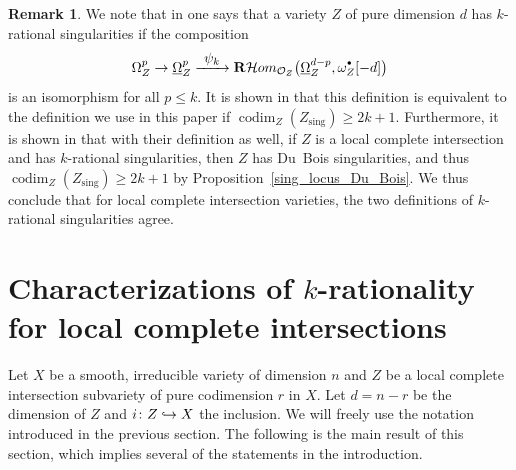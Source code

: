 \documentclass[11pt]{article}
\numberwithin{equation}{section}
\newcommand{\To}[1]{\mathchoice{\xrightarrow{\textstyle\kern4pt#1\kern3pt}}{\stackrel{#1}{\longrightarrow}}{}{}}
\newcommand\hto{\mathrel{\lhook\joinrel\to}}
\newcommand{\sbullet}{{\scriptscriptstyle\bullet}}
\newcommand{\csbullet}{{\raisebox{1pt}{$\sbullet$}}}
\theoremstyle{plain}
\theoremstyle{definition}
\newtheorem{rmk}[thm]{Remark}
\newcommand\R{{\mathbf R}}
\newcommand\cH{\mathcal{H}}
\newcommand\cO{\mathcal{O}}
\newcommand\cH{\mathcal{H}}
\newcommand\cO{\mathcal{O}}
\newcommand\sing{\mathrm{sing}}
\DeclareMathOperator{\codim}{codim}
\begin{document}
\begin{rmk}\label{rmk_equiv_two_defi}
We note that in \cite{FL2} one says that a variety $Z$ of pure dimension $d$ has $k$-rational singularities if the composition
\[\Omega_Z^p\to \underline{\Omega}_Z^p\To{\psi_k}\R\cH om_{\cO_Z}\big(\underline{\Omega}_Z^{d-p},\omega_Z^{\csbullet}[-d]\big)\]
is an isomorphism for all $p\leq k$. It is shown in \cite[Cor.\,3.17]{FL2} that this definition is equivalent to the definition we use in this paper if $\codim_Z(Z_\sing)\geq 2k+1$.
Furthermore, it is shown in \cite[Th.\,3.20]{FL2} that with their definition as well, if $Z$ is a local complete intersection and has $k$-rational singularities,
then $Z$ has Du~Bois singularities, and thus $\codim_Z(Z_\sing)\geq 2k+1$ by Proposition~\ref{sing_locus_Du_Bois}. We thus conclude
that for local complete intersection varieties, the two definitions of $k$-rational singularities agree.
\end{rmk}

\section{Characterizations of \texorpdfstring{$k$}{k}-rationality for local complete intersections}\label{section3}

Let $X$ be a smooth, irreducible variety of dimension $n$ and $Z$ be a local complete intersection subvariety of pure codimension $r$ in $X$. Let $d=n-r$ be the dimension of $Z$ and $i\colon Z\hto X$ the inclusion. We will freely use the notation introduced in the previous section.
The following is the main result of this section, which implies several of the statements in the introduction.
\end{document}
